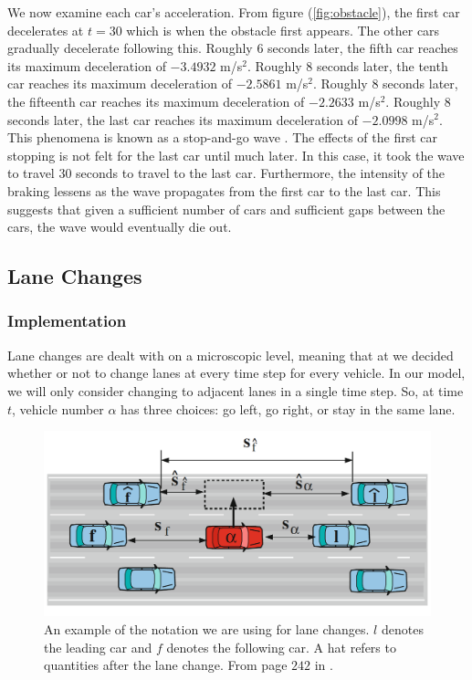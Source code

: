 \documentclass[12pt]{article}
\begin{document}
    We now examine each car's acceleration. From figure (\ref{fig:obstacle}), the first car decelerates at $t=30$ which is when the obstacle first appears. The other cars gradually decelerate following this. Roughly $6$ seconds later, the fifth car reaches its maximum deceleration of $-3.4932$ m/s$^2$. Roughly $8$ seconds later, the tenth car reaches its maximum deceleration of $-2.5861$ m/s$^2$. Roughly $8$ seconds later, the fifteenth car reaches its maximum deceleration of $-2.2633$ m/s$^2$. Roughly $8$ seconds later, the last car reaches its maximum deceleration of $-2.0998$ m/s$^2$. This phenomena is known as a stop-and-go wave \cite{traffic}. The effects of the first car stopping is not felt for the last car until much later. In this case, it took the wave to travel $30$ seconds to travel to the last car. Furthermore, the intensity of the braking lessens as the wave propagates from the first car to the last car. This suggests that given a sufficient number of cars and sufficient gaps between the cars, the wave would eventually die out. 
    \subsection{Lane Changes}
    \subsubsection{Implementation}\label{sec:laneChangeImplementation}

   Lane changes are dealt with on a microscopic level, meaning that at we decided whether or not to change lanes at every time step for every vehicle.  In our model, we will only consider changing to adjacent lanes in a single time step. So, at time $t$, vehicle number $\alpha$ has three choices: go left, go right, or stay in the same lane.

      \begin{figure}[H]
        \begin{center}
          \includegraphics{lane_change_diagram.PNG}
        \end{center}
        \caption{An example of the notation we are using for lane changes. $l$ denotes the leading car and $f$ denotes the following car. A hat refers to quantities after the lane change. From page $242$ in \cite{traffic}.}
      \end{figure}
\end{document}
